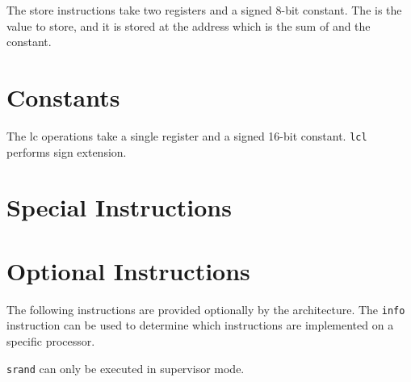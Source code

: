 The store instructions take two registers and a signed 8-bit constant. 
The  is the value to store, and it is stored at the address
which is the sum of  and the constant.

\begin{description}

\item	{}
\item	{}
\end{description}

\begin{description}
\item	{}
\end{description}

\section{Constants}

The lc operations take a single register and a signed 16-bit constant. 
{\tt lcl} performs sign extension.

\begin{description}

\item	{} 
\item	{} 

\end{description}

\section{Special Instructions}

\begin{description}
\item	{}
\item	{}
\end{description}

\section{Optional Instructions}

The following instructions are provided optionally by the architecture.
The {\tt info} instruction can be used to determine which instructions
are implemented on a specific processor.

{\tt srand} can only be executed in supervisor mode.

